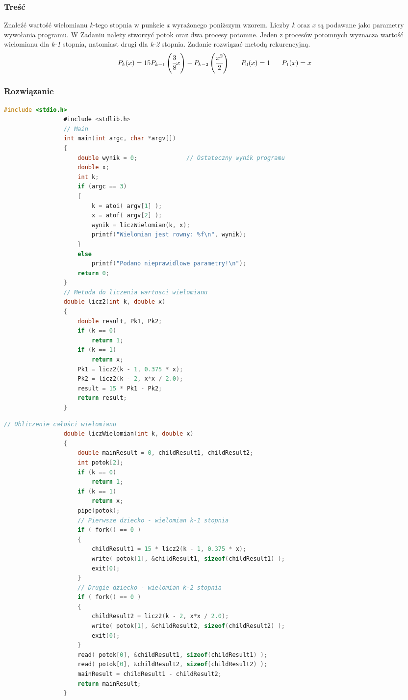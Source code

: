 		\subsubsection{Treść}
			Znaleźć wartość wielomianu \textit{k}-tego stopnia w punkcie \textit{x} wyrażonego poniższym wzorem. Liczby \textit{k} oraz \textit{x} są podawane jako parametry wywołania programu. W Zadaniu należy stworzyć potok oraz dwa procesy potomne. Jeden z procesów potomnych wyznacza wartość wielomianu dla \textit{k-1} stopnia, natomiast drugi dla \textit{k-2} stopnia. Zadanie rozwiązać metodą rekurencyjną.
			$$ P_k(x)=15P_{k-1}\left(\cfrac{3}{8}x\right)-P_{k-2}\left(\cfrac{x^2}{2}\right)\;\;\;\;\;\;P_0(x)=1\;\;\;\;\;\;P_1(x)=x$$
		\subsubsection{Rozwiązanie}
			\begin{lstlisting}[language=C]
				 #include <stdio.h>
				 #include <stdlib.h>
				 // Main
				 int main(int argc, char *argv[])
				 {	
					 double wynik = 0;				// Ostateczny wynik programu
					 double x;
					 int k;
					 if (argc == 3)
					 {		
						 k = atoi( argv[1] );
						 x = atof( argv[2] );
						 wynik = liczWielomian(k, x);
						 printf("Wielomian jest rowny: %f\n", wynik);
					 }
					 else
						 printf("Podano nieprawidlowe parametry!\n");
					 return 0;
				 }
				 // Metoda do liczenia wartosci wielomianu
				 double licz2(int k, double x)
				 {
					 double result, Pk1, Pk2;
					 if (k == 0)
						 return 1;
					 if (k == 1)
						 return x;
					 Pk1 = licz2(k - 1, 0.375 * x);
					 Pk2 = licz2(k - 2, x*x / 2.0);
					 result = 15 * Pk1 - Pk2;
					 return result;
				 }
			\end{lstlisting}
			\newpage
			\begin{lstlisting}[language=C]
				 // Obliczenie całości wielomianu
				 double liczWielomian(int k, double x)
				 {
					 double mainResult = 0, childResult1, childResult2;
					 int potok[2];
					 if (k == 0)
						 return 1;
					 if (k == 1)
						 return x;
					 pipe(potok);
					 // Pierwsze dziecko - wielomian k-1 stopnia
					 if ( fork() == 0 )
					 {
						 childResult1 = 15 * licz2(k - 1, 0.375 * x);
						 write( potok[1], &childResult1, sizeof(childResult1) );
						 exit(0);
					 }
					 // Drugie dziecko - wielomian k-2 stopnia
					 if ( fork() == 0 )
					 {
						 childResult2 = licz2(k - 2, x*x / 2.0);
						 write( potok[1], &childResult2, sizeof(childResult2) );
						 exit(0);
					 }
					 read( potok[0], &childResult1, sizeof(childResult1) );
					 read( potok[0], &childResult2, sizeof(childResult2) );
					 mainResult = childResult1 - childResult2;
					 return mainResult;
				 }
			\end{lstlisting}